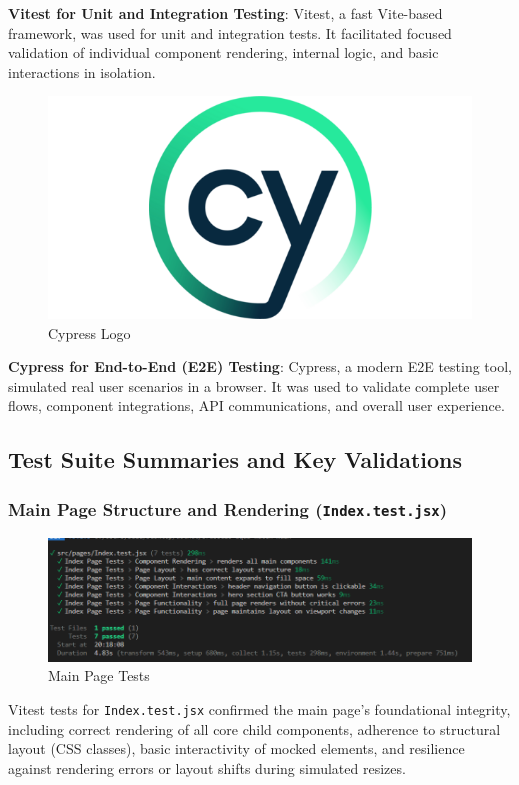 \textbf{Vitest for Unit and Integration Testing}:
\label{sssec:vitest_intro_summary}
Vitest, a fast Vite-based framework, was used for unit and integration tests. It facilitated focused validation of individual component rendering, internal logic, and basic interactions in isolation.
\begin{figure}[h]
    \centering
    \includegraphics[width=0.5\linewidth]{Figures/cypress.png}
    \caption{Cypress Logo}
    \label{fig:enter-label}
\end{figure}

\textbf{Cypress for End-to-End (E2E) Testing}:
\label{sssec:cypress_intro_summary}
Cypress, a modern E2E testing tool, simulated real user scenarios in a browser. It was used to validate complete user flows, component integrations, API communications, and overall user experience.

\subsection{Test Suite Summaries and Key Validations}
\label{ssec:test_summaries_summary}


\subsubsection{Main Page Structure and Rendering (\texttt{Index.test.jsx})}
\label{sssec:index_test_summary_summary}
\begin{figure}[H]
    \centering
    \includegraphics[width=0.75\linewidth]{Figures/test1.png}
    \caption{Main Page Tests}
    \label{fig:enter-label}
\end{figure}
Vitest tests for \texttt{Index.test.jsx} confirmed the main page's foundational integrity, including correct rendering of all core child components, adherence to structural layout (CSS classes), basic interactivity of mocked elements, and resilience against rendering errors or layout shifts during simulated resizes.

